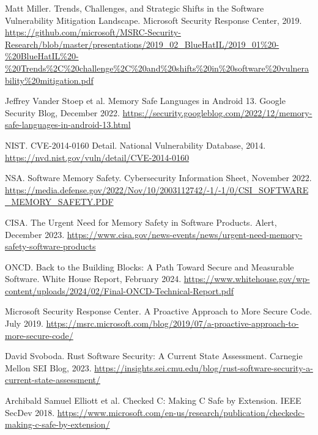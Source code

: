 \documentclass[11pt]{article}
\begin{document}

\begin{thebibliography}{99}

Matt Miller.
\newblock Trends, Challenges, and Strategic Shifts in the Software Vulnerability Mitigation Landscape.
\newblock Microsoft Security Response Center, 2019.
\newblock \url{https://github.com/microsoft/MSRC-Security-Research/blob/master/presentations/2019_02_BlueHatIL/2019_01\%20-\%20BlueHatIL\%20-\%20Trends\%2C\%20challenge\%2C\%20and\%20shifts\%20in\%20software\%20vulnerability\%20mitigation.pdf}

Jeffrey Vander Stoep et al.
\newblock Memory Safe Languages in Android 13.
\newblock Google Security Blog, December 2022.
\newblock \url{https://security.googleblog.com/2022/12/memory-safe-languages-in-android-13.html}

NIST.
\newblock CVE-2014-0160 Detail.
\newblock National Vulnerability Database, 2014.
\newblock \url{https://nvd.nist.gov/vuln/detail/CVE-2014-0160}

NSA.
\newblock Software Memory Safety.
\newblock Cybersecurity Information Sheet, November 2022.
\newblock \url{https://media.defense.gov/2022/Nov/10/2003112742/-1/-1/0/CSI_SOFTWARE_MEMORY_SAFETY.PDF}

CISA.
\newblock The Urgent Need for Memory Safety in Software Products.
\newblock Alert, December 2023.
\newblock \url{https://www.cisa.gov/news-events/news/urgent-need-memory-safety-software-products}

ONCD.
\newblock Back to the Building Blocks: A Path Toward Secure and Measurable Software.
\newblock White House Report, February 2024.
\newblock \url{https://www.whitehouse.gov/wp-content/uploads/2024/02/Final-ONCD-Technical-Report.pdf}

Microsoft Security Response Center.
\newblock A Proactive Approach to More Secure Code.
\newblock July 2019.
\newblock \url{https://msrc.microsoft.com/blog/2019/07/a-proactive-approach-to-more-secure-code/}

David Svoboda.
\newblock Rust Software Security: A Current State Assessment.
\newblock Carnegie Mellon SEI Blog, 2023.
\newblock \url{https://insights.sei.cmu.edu/blog/rust-software-security-a-current-state-assessment/}

Archibald Samuel Elliott et al.
\newblock Checked C: Making C Safe by Extension.
\newblock IEEE SecDev 2018.
\newblock \url{https://www.microsoft.com/en-us/research/publication/checkedc-making-c-safe-by-extension/}


\end{thebibliography}
\end{document}
